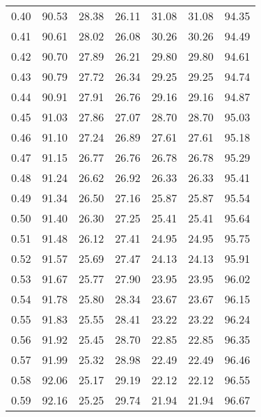 \begin{tabular}{|c|c|c|c|c|c|c|}
      0.40 &     90.53 &     28.38 &      26.11 &   31.08 &      31.08 &         94.35 \\
      0.41 &     90.61 &     28.02 &      26.08 &   30.26 &      30.26 &         94.49 \\
      0.42 &     90.70 &     27.89 &      26.21 &   29.80 &      29.80 &         94.61 \\
      0.43 &     90.79 &     27.72 &      26.34 &   29.25 &      29.25 &         94.74 \\
      0.44 &     90.91 &     27.91 &      26.76 &   29.16 &      29.16 &         94.87 \\
      0.45 &     91.03 &     27.86 &      27.07 &   28.70 &      28.70 &         95.03 \\
      0.46 &     91.10 &     27.24 &      26.89 &   27.61 &      27.61 &         95.18 \\
      0.47 &     91.15 &     26.77 &      26.76 &   26.78 &      26.78 &         95.29 \\
      0.48 &     91.24 &     26.62 &      26.92 &   26.33 &      26.33 &         95.41 \\
      0.49 &     91.34 &     26.50 &      27.16 &   25.87 &      25.87 &         95.54 \\
      0.50 &     91.40 &     26.30 &      27.25 &   25.41 &      25.41 &         95.64 \\
      0.51 &     91.48 &     26.12 &      27.41 &   24.95 &      24.95 &         95.75 \\
      0.52 &     91.57 &     25.69 &      27.47 &   24.13 &      24.13 &         95.91 \\
      0.53 &     91.67 &     25.77 &      27.90 &   23.95 &      23.95 &         96.02 \\
      0.54 &     91.78 &     25.80 &      28.34 &   23.67 &      23.67 &         96.15 \\
      0.55 &     91.83 &     25.55 &      28.41 &   23.22 &      23.22 &         96.24 \\
      0.56 &     91.92 &     25.45 &      28.70 &   22.85 &      22.85 &         96.35 \\
      0.57 &     91.99 &     25.32 &      28.98 &   22.49 &      22.49 &         96.46 \\
      0.58 &     92.06 &     25.17 &      29.19 &   22.12 &      22.12 &         96.55 \\
      0.59 &     92.16 &     25.25 &      29.74 &   21.94 &      21.94 &         96.67 \\

\end{tabular}
